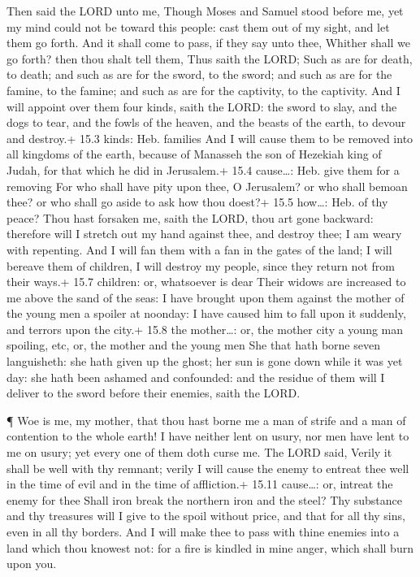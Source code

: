  Then said the LORD unto me, Though Moses and Samuel stood
before me, yet my mind could not be toward this people: cast them out of
my sight, and let them go forth.  And it shall come to pass,
if they say unto thee, Whither shall we go forth? then thou shalt tell
them, Thus saith the LORD; Such as are for death, to death; and such as
are for the sword, to the sword; and such as are for the famine, to the
famine; and such as are for the captivity, to the captivity.
 And I will appoint over them four kinds, saith the LORD:
the sword to slay, and the dogs to tear, and the fowls of the heaven,
and the beasts of the earth, to devour and destroy.+ 15.3 kinds: Heb.
families  And I will cause them to be removed into all
kingdoms of the earth, because of Manasseh the son of Hezekiah king of
Judah, for that which he did in Jerusalem.+ 15.4 cause\ldots: Heb. give
them for a removing  For who shall have pity upon thee, O
Jerusalem? or who shall bemoan thee? or who shall go aside to ask how
thou doest?+ 15.5 how\ldots: Heb. of thy peace?  Thou hast
forsaken me, saith the LORD, thou art gone backward: therefore will I
stretch out my hand against thee, and destroy thee; I am weary with
repenting.  And I will fan them with a fan in the gates of
the land; I will bereave them of children, I will destroy my people,
since they return not from their ways.+ 15.7 children: or, whatsoever is
dear  Their widows are increased to me above the sand of the
seas: I have brought upon them against the mother of the young men a
spoiler at noonday: I have caused him to fall upon it suddenly, and
terrors upon the city.+ 15.8 the mother\ldots: or, the mother city a
young man spoiling, etc, or, the mother and the young men 
She that hath borne seven languisheth: she hath given up the ghost; her
sun is gone down while it was yet day: she hath been ashamed and
confounded: and the residue of them will I deliver to the sword before
their enemies, saith the LORD.

 ¶ Woe is me, my mother, that thou hast borne me a man of
strife and a man of contention to the whole earth! I have neither lent
on usury, nor men have lent to me on usury; yet every one of them doth
curse me.  The LORD said, Verily it shall be well with thy
remnant; verily I will cause the enemy to entreat thee well in the time
of evil and in the time of affliction.+ 15.11 cause\ldots: or, intreat
the enemy for thee  Shall iron break the northern iron and
the steel?  Thy substance and thy treasures will I give to
the spoil without price, and that for all thy sins, even in all thy
borders.  And I will make thee to pass with thine enemies
into a land which thou knowest not: for a fire is kindled in mine anger,
which shall burn upon you.

